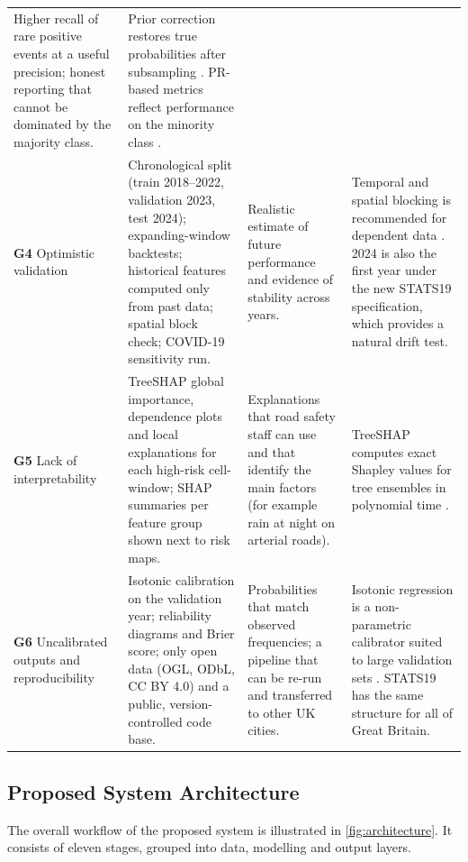 \begin{table}[t]
\begin{tabularx}{\textwidth}{L{2.3cm} Y Y Y}
Higher recall of rare positive events at a useful precision; honest reporting that cannot be dominated by the majority class. &
Prior correction restores true probabilities after subsampling \cite{king2001logistic,dalpozzolo2015calibrating}. PR-based metrics reflect performance on the minority class \cite{saito2015precision}. \\
\addlinespace
\textbf{G4} Optimistic validation &
Chronological split (train 2018--2022, validation 2023, test 2024); expanding-window backtests; historical features computed only from past data; spatial block check; COVID-19 sensitivity run. &
Realistic estimate of future performance and evidence of stability across years. &
Temporal and spatial blocking is recommended for dependent data \cite{roberts2017cross,cerqueira2020evaluating}. 2024 is also the first year under the new STATS19 specification, which provides a natural drift test. \\
\addlinespace
\textbf{G5} Lack of interpretability &
TreeSHAP global importance, dependence plots and local explanations for each high-risk cell-window; SHAP summaries per feature group shown next to risk maps. &
Explanations that road safety staff can use and that identify the main factors (for example rain at night on arterial roads). &
TreeSHAP computes exact Shapley values for tree ensembles in polynomial time \cite{lundberg2017unified,lundberg2020local}. \\
\addlinespace
\textbf{G6} Uncalibrated outputs and reproducibility &
Isotonic calibration on the validation year; reliability diagrams and Brier score; only open data (OGL, ODbL, CC BY 4.0) and a public, version-controlled code base. &
Probabilities that match observed frequencies; a pipeline that can be re-run and transferred to other UK cities. &
Isotonic regression is a non-parametric calibrator suited to large validation sets \cite{zadrozny2002transforming,niculescu2005predicting}. STATS19 has the same structure for all of Great Britain. \\
\bottomrule
\end{tabularx}
\end{table}

\subsection{Proposed System Architecture}
\label{sec:architecture}

The overall workflow of the proposed system is illustrated in \cref{fig:architecture}. It consists of eleven stages, grouped into data, modelling and output layers.

